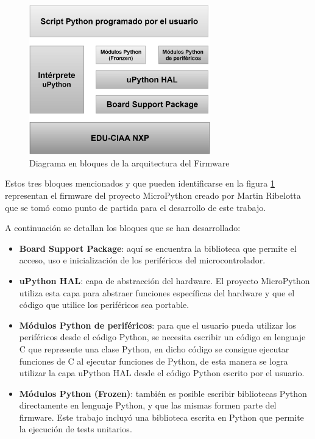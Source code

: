 \begin{figure}[ht]
  \centering
    \includegraphics[width=0.7\textwidth]{Figures/fig_firm_arquitectura}
  \caption{Diagrama en bloques de la arquitectura del Firmware}
  \label{fig:firmwareArq}
\end{figure}

Estos tres bloques mencionados y que pueden identificarse en la figura \ref{fig:firmwareArq} representan el firmware del proyecto MicroPython creado por Martin Ribelotta que se tomó como punto de partida para el desarrollo de este trabajo. 

A continuación se detallan los bloques que se han desarrollado:

\begin{itemize}
	\item \textbf{Board Support Package}: aquí se encuentra la biblioteca que permite el acceso, uso e inicialización de los periféricos del microcontrolador.
	\item \textbf{uPython HAL}: capa de abstracción del hardware. El proyecto MicroPython utiliza esta capa para abstraer funciones específicas del hardware y que el código que utilice los periféricos sea portable.
	\item \textbf{Módulos Python de periféricos}: para que el usuario pueda utilizar los periféricos desde el código Python, se necesita escribir un código en lenguaje C que represente una clase Python, en dicho código se consigue ejecutar funciones de C al ejecutar funciones de Python, de esta manera se logra utilizar la capa uPython HAL desde el código Python escrito por el usuario.
	\item \textbf{Módulos Python (Frozen)}: también es posible escribir bibliotecas Python directamente en lenguaje Python, y que las mismas formen parte del firmware. Este trabajo incluyó una biblioteca escrita en Python que permite la ejecución de tests unitarios.
\end{itemize}

